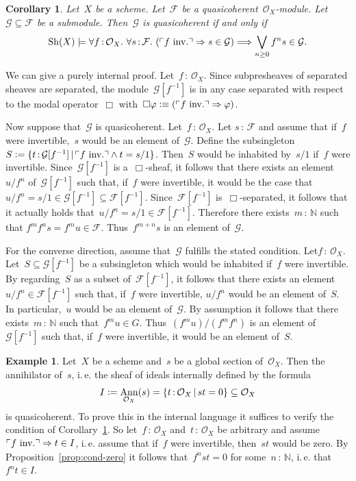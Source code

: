 \documentclass[10pt,reqno,a4paper]{amsbook}
\makeatletter
\theoremstyle{definition}
\newtheorem{ex}[defn]{Example}
\theoremstyle{plain}
\newtheorem{cor}[defn]{Corollary}
\theoremstyle{remark}
\newcommand{\F}{\mathcal{F}}
\newcommand{\G}{\mathcal{G}}
\renewcommand{\O}{\mathcal{O}}
\newcommand{\NN}{\mathbb{N}}
\newcommand{\Sh}{\mathrm{Sh}}
\DeclareMathOperator{\Ann}{Ann}
\newcommand{\?}{\,{:}\,}
\renewcommand{\_}{\mathpunct{.}\,}
\newcommand{\speak}[1]{\ulcorner\text{\textnormal{#1}}\urcorner}
\newcommand{\ie}{i.\,e.\@\xspace}
\newcommand{\inv}{inv.\@}
\newcommand{\defeq}{\vcentcolon=}
\newcommand{\defequiv}{\vcentcolon\equiv}
\renewenvironment{proof}[1][\proofname]{\par
  \pushQED{\qed}%
  \normalfont \topsep6\p@\@plus6\p@\relax
  \trivlist
  \item[\hskip\labelsep
        \itshape
    #1\@addpunct{.}]\ignorespaces
}{%
  \popQED\endtrivlist\@endpefalse
}
\makeatother
\begin{document}
\begin{cor}\label{cor:submodule-qcoh}
Let~$X$ be a scheme. Let~$\F$ be a quasicoherent~$\O_X$-module.
Let~$\G \subseteq \F$ be a submodule. Then~$\G$ is quasicoherent if and only
if
\[ \Sh(X) \models \forall f\?\O_X\_
  \forall s\?\F\_
  (\speak{$f$ \inv} \Rightarrow s \in \G) \Longrightarrow
  \bigvee_{n \geq 0} f^n s \in \G. \]
\end{cor}
\begin{proof}We can give a purely internal proof. Let~$f\?\O_X$.
Since subpresheaves of separated sheaves are separated, the module~$\G[f^{-1}]$
is in any case separated with respect to the modal operator~$\Box$
with~$\Box\varphi \defequiv (\speak{$f$ \inv} \Rightarrow \varphi)$.

Now suppose that~$\G$ is quasicoherent. Let~$f\?\O_X$. Let $s\?\F$ and assume that
if~$f$ were invertible,~$s$ would be an element of~$\G$. Define the
subsingleton~$S \defeq \{ t\?\G[f^{-1}] \,|\, \speak{$f$ \inv} \wedge t=s/1 \}$.
Then~$S$ would be inhabited by~$s/1$ if~$f$ were invertible. Since~$\G[f^{-1}]$
is a~$\Box$-sheaf, it follows that there exists an element~$u/f^n$ of~$\G[f^{-1}]$
such that, if~$f$ were invertible, it would be the case that~$u/f^n = s/1 \in
\G[f^{-1}] \subseteq \F[f^{-1}]$.
Since~$\F[f^{-1}]$ is~$\Box$-separated, it follows that it actually holds that~$u/f^n
= s/1 \in \F[f^{-1}]$. Therefore there exists~$m\?\NN$ such that $f^m f^n s =
f^m u \in \F$. Thus~$f^{m+n} s$ is an element of~$\G$.

For the converse direction, assume that~$\G$ fulfills the stated condition.
Let$f\?\O_X$. Let~$S \subseteq \G[f^{-1}]$ be a subsingleton which would be
inhabited if~$f$ were invertible. By regarding~$S$ as a subset of~$\F[f^{-1}]$,
it follows that there exists an element~$u/f^n \in \F[f^{-1}]$ such that,
if~$f$ were invertible, $u/f^n$ would be an element of~$S$. In particular,~$u$
would be an element of~$\G$. By assumption
it follows that there exists~$m\?\NN$ such that~$f^m u \in G$. Thus~$(f^m u) /
(f^m f^n)$ is an element of~$\G[f^{-1}]$ such that, if~$f$ were invertible, it
would be an element of~$S$.
\end{proof}

\begin{ex}\label{ex:annihilator-qcoh}
Let~$X$ be a scheme and~$s$ be a global section of~$\O_X$. Then the
annihilator of~$s$, \ie the sheaf of ideals internally defined by the
formula
\[ I \defeq \Ann_{\O_X}(s) = \{ t\?\O_X \,|\, st = 0 \} \subseteq \O_X \]
is quasicoherent. To prove this in the internal language it suffices to
verify the condition of Corollary~\ref{cor:submodule-qcoh}.
So let~$f\?\O_X$ and~$t\?\O_X$ be arbitrary and assume~$\speak{$f$ \inv} \Rightarrow t \in I$,
\ie assume that if~$f$ were invertible, then~$st$ would be zero. By
Proposition~\ref{prop:cond-zero} it follows that~$f^n st = 0$ for
some~$n\?\NN$, \ie that~$f^n t \in I$.
\end{ex}
\end{document}
